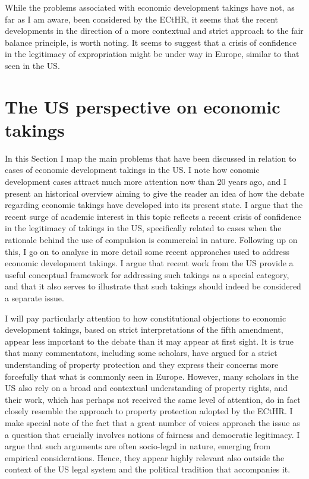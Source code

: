 While the problems associated with economic development takings have not, as far as I am aware, been considered by the ECtHR, it seems that the recent developments in the direction of a more contextual and strict approach to the fair balance principle, is worth noting. It seems to suggest that a crisis of confidence in the legitimacy of expropriation might be under way in Europe, similar to that seen in the US.

\section{The US perspective on economic takings}

In this Section I map the main problems that have been discussed in relation to cases of economic development takings in the US. I note how conomic development cases attract much more attention now than 20 years ago, and I present an historical overview aiming to give the reader an idea of how the debate regarding economic takings have developed into its present state. I argue that the recent surge of academic interest in this topic reflects a recent crisis of confidence in the legitimacy of takings in the US, specifically related to cases when the rationale behind the use of compulsion is commercial in nature. Following up on this, I go on to analyse in more detail some recent approaches used to address economic development takings. I argue that recent work from the US provide a useful conceptual framework for addressing such takings as a special category, and that it also serves to illustrate that such takings should indeed be considered a separate issue. %

I will pay particularly attention to how constitutional objections to economic development takings, based on strict interpretations of the fifth amendment, appear less important to the debate than it may appear at first sight. It is true that many commentators, including some scholars, have argued for a strict understanding of property protection and they express their concerns more forcefully that what is commonly seen in Europe. However, many scholars in the US also rely on a broad and contextual understanding of property rights, and their work, which has perhaps not received the same level of attention, do in fact closely resemble the approach to property protection adopted by the ECtHR. I make special note of the fact that a great number of voices approach the issue as a question that crucially involves notions of fairness and democratic legitimacy.  I argue that such arguments are often socio-legal in nature, emerging from empirical considerations. Hence, they appear highly relevant also outside the context of the US legal system and the political tradition that accompanies it.

